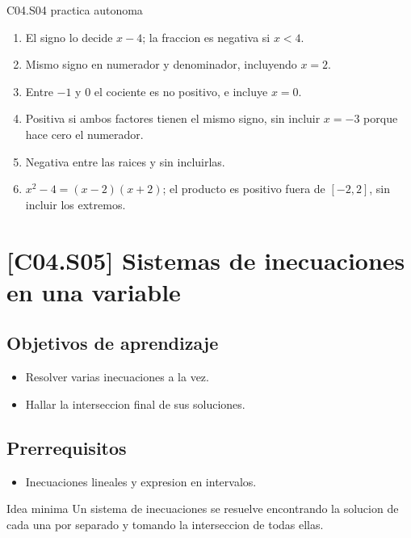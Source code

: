 \begin{fullsolution}{C04.S04 practica autonoma}
\begin{enumerate}[label=\textbf{PX-C04.S04-\arabic*:}, leftmargin=*]
  \item El signo lo decide \(x-4\); la fraccion es negativa si \(x<4\).
  \item Mismo signo en numerador y denominador, incluyendo \(x=2\).
  \item Entre \(-1\) y \(0\) el cociente es no positivo, e incluye \(x=0\).
  \item Positiva si ambos factores tienen el mismo signo, sin incluir \(x=-3\) porque hace cero el numerador.
  \item Negativa entre las raices y sin incluirlas.
  \item \(x^2-4=(x-2)(x+2)\); el producto es positivo fuera de \([-2,2]\), sin incluir los extremos.
\end{enumerate}
\end{fullsolution}

\section{[C04.S05] Sistemas de inecuaciones en una variable}

\subsection*{Objetivos de aprendizaje}
\begin{itemize}
  \item Resolver varias inecuaciones a la vez.
  \item Hallar la interseccion final de sus soluciones.
\end{itemize}

\subsection*{Prerrequisitos}
\begin{itemize}
  \item Inecuaciones lineales y expresion en intervalos.
\end{itemize}

\begin{theorybox}{Idea minima}
Un sistema de inecuaciones se resuelve encontrando la solucion de cada una por separado y
tomando la interseccion de todas ellas.
\end{theorybox}


